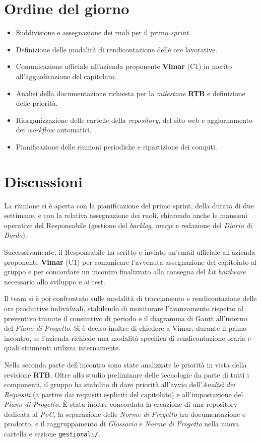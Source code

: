 \documentclass[11pt, a4paper]{article}
\begin{document}
\section{Ordine del giorno}
\begin{itemize}
    \item Suddivisione e assegnazione dei ruoli per il primo \textit{sprint}.
    \item Definizione delle modalità di rendicontazione delle ore lavorative.
    \item Comunicazione ufficiale all'azienda proponente \textbf{Vimar} (C1) in merito all'aggiudicazione del capitolato.
    \item Analisi della documentazione richiesta per la \textit{milestone} \textbf{RTB} e definizione delle priorità.
    \item Riorganizzazione delle cartelle della \textit{repository}, del sito web e aggiornamento dei \textit{workflow} automatici.
    \item Pianificazione delle riunioni periodiche e ripartizione dei compiti.
\end{itemize}

\section{Discussioni}
La riunione si è aperta con la pianificazione del primo sprint, della durata di due settimane, e con la relativa assegnazione dei ruoli, chiarendo anche le mansioni operative del Responsabile (gestione del \textit{backlog}, \textit{merge} e redazione del \textit{Diario di Bordo}).

Successivamente, il Responsabile ha scritto e inviato un'email ufficiale all'azienda proponente \textbf{Vimar} (C1) per comunicare l'avvenuta assegnazione del capitolato al gruppo e per concordare un incontro finalizzato alla consegna del \textit{kit hardware} necessario allo sviluppo e ai test.

Il team si è poi confrontato sulle modalità di tracciamento e rendicontazione delle ore produttive individuali, stabilendo di monitorare l'avanzamento rispetto al preventivo tramite il consuntivo di periodo e il diagramma di Gantt all'interno del \textit{Piano di Progetto}. Si è deciso inoltre di chiedere a Vimar, durante il primo incontro, se l'azienda richiede una modalità specifica di rendicontazione oraria e quali strumenti utilizza internamente.

Nella seconda parte dell'incontro sono state analizzate le priorità in vista della revisione \textbf{RTB}. Oltre allo studio preliminare delle tecnologie da parte di tutti i componenti, il gruppo ha stabilito di dare priorità all'avvio dell'\textit{Analisi dei Requisiti} (a partire dai requisiti espliciti del capitolato) e all'impostazione del \textit{Piano di Progetto}. È stata inoltre concordata la creazione di una repository dedicata al \textit{PoC}, la separazione delle \textit{Norme di Progetto} tra documentazione e prodotto, e il raggruppamento di \textit{Glossario} e \textit{Norme di Progetto} nella nuova cartella e sezione \texttt{gestionali/}.
\end{document}
